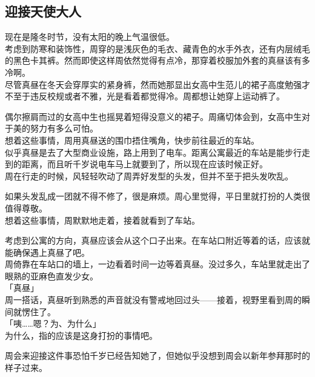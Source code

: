 \subsection{迎接天使大人}

现在是隆冬时节，没有太阳的晚上气温很低。\\

考虑到防寒和装饰性，周穿的是浅灰色的毛衣、藏青色的水手外衣，还有内层绒毛的黑色卡其裤。然而即使这样周依然觉得有点冷，那穿着校服加外套的真昼该有多冷啊。\\

尽管真昼在冬天会穿厚实的紧身裤，然而她那显出女高中生范儿的裙子高度勉强才不至于违反校规或者不雅，光是看着都觉得冷。周都想让她穿上运动裤了。

偶尔擦肩而过的女高中生也摇晃着短得没意义的裙子。周痛切体会到，女高中生对于美的努力有多么可怕。\\

想着这些事情，周用真昼送的围巾捂住嘴角，快步前往最近的车站。\\

似乎真昼是去了大型商业设施，路上用到了电车。距离公寓最近的车站是能步行走到的距离，而且听千岁说电车马上就要到了，所以现在应该时候正好。\\

周在行走的时候，风轻轻吹动了周弄好发型的头发，但并不至于把头发吹乱。

如果头发乱成一团就不得不修了，很是麻烦。周心里觉得，平日里就打扮的人类很值得尊敬。\\

想着这些事情，周默默地走着，接着就看到了车站。

考虑到公寓的方向，真昼应该会从这个口子出来。在车站口附近等着的话，应该就能确保遇上真昼了吧。\\

周倚靠在车站口的墙上，一边看着时间一边等着真昼。没过多久，车站里就走出了眼熟的亚麻色直发少女。\\

「真昼」\\

周一搭话，真昼听到熟悉的声音就没有警戒地回过头——接着，视野里看到周的瞬间就愣住了。\\

「咦……嗯？为、为什么」\\

为什么，指的应该是这身打扮的事情吧。

周会来迎接这件事恐怕千岁已经告知她了，但她似乎没想到周会以新年参拜那时的样子过来。\\

